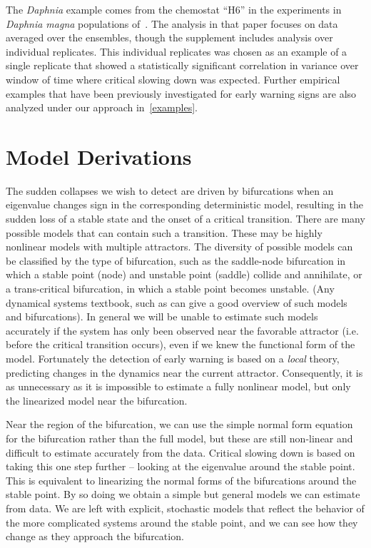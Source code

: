 \documentclass[authoryear, preprint,review,12pt]{elsarticle}
\begin{document}
The \emph{Daphnia} example comes from the chemostat ``H6'' in the experiments in \emph{Daphnia magna} populations of~\citet{Drake2010}. 
The analysis in that paper focuses on data averaged over the ensembles, though the supplement includes analysis over individual replicates. 
This individual replicates was chosen as an example of a single replicate 
that showed a statistically significant correlation in variance over window of time where critical slowing down was expected. 
Further empirical examples that have been previously investigated for early warning signs are also analyzed under our approach in~\ref{examples}.   



\section{Model Derivations}\label{modelderivations}
The sudden collapses we wish to detect are driven by bifurcations when an eigenvalue changes sign in the corresponding deterministic model,
resulting in the sudden loss of a stable state and the onset of a critical transition.
There are many possible models that can contain such a transition.
These may be highly nonlinear models with multiple attractors.
The diversity of possible models can be classified by the type of bifurcation,
such as the saddle-node bifurcation in which a stable point (node) and unstable point (saddle) collide and annihilate,
or a trans-critical bifurcation, in which a stable point becomes unstable.  
(Any dynamical systems textbook, such as \citet{Guckenheimer1983} can give a good overview of such models and bifurcations). 
In general we will be unable to estimate such models accurately if the system has only been observed near the favorable attractor
(i.e. before the critical transition occurs),
even if we knew the functional form of the model.
Fortunately the detection of early warning is based on a \emph{local} theory,
predicting changes in the dynamics near the current attractor.
Consequently, it is as unnecessary as it is impossible to estimate a fully nonlinear model,
but only the linearized model near the bifurcation.

Near the region of the bifurcation,
we can use the simple normal form equation for the bifurcation rather than the full model,
but these are still non-linear and difficult to estimate accurately from the data.
Critical slowing down is based on taking this one step further -- looking at the eigenvalue around the stable point.
This is equivalent to linearizing the normal forms of the bifurcations around the stable point.
By so doing we obtain a simple but general models we can estimate from data.
We are left with explicit, stochastic models that reflect the behavior of the more complicated systems around the stable point,
and we can see how they change as they approach the bifurcation.  
\end{document}
